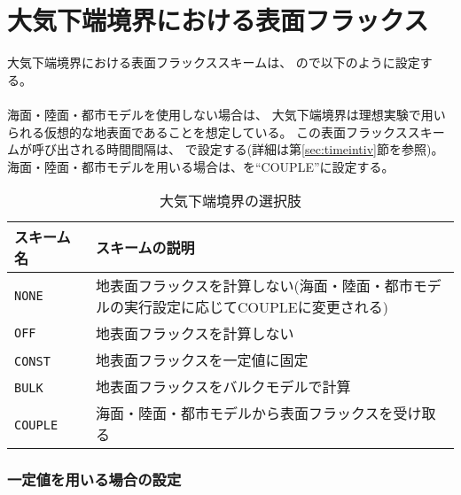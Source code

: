 \section{大気下端境界における表面フラックス}
\label{sec:basic_usel_surface}
大気下端境界における表面フラックススキームは、
ので以下のように設定する。\\

\\

海面・陸面・都市モデルを使用しない場合は、
大気下端境界は理想実験で用いられる仮想的な地表面であることを想定している。
この表面フラックススキームが呼び出される時間間隔は、
で設定する(詳細は第\ref{sec:timeintiv}節を参照)。
海面・陸面・都市モデルを用いる場合は、を``COUPLE''に設定する。


\begin{table}[h]
\begin{center}
  \caption{大気下端境界の選択肢}
  \label{tab:nml_atm_sf}
  \begin{tabularx}{150mm}{lX} \hline
    \rowcolor[gray]{0.9}  スキーム名 & スキームの説明\\ \hline
      \verb|NONE|         & 地表面フラックスを計算しない(海面・陸面・都市モデルの実行設定に応じてCOUPLEに変更される) \\
      \verb|OFF|          & 地表面フラックスを計算しない \\
      \verb|CONST|   　　　& 地表面フラックスを一定値に固定 \\
      \verb|BULK|    　　　& 地表面フラックスをバルクモデルで計算 \\
      \verb|COUPLE|  　　　& 海面・陸面・都市モデルから表面フラックスを受け取る \\
    \hline
  \end{tabularx}
\end{center}
\end{table}

\subsubsection{一定値を用いる場合の設定}

